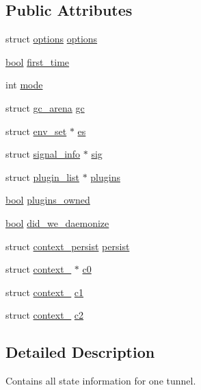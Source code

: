 \subsection*{Public Attributes}
\begin{DoxyCompactItemize}
\item 
struct \hyperlink{structoptions}{options} \hyperlink{structcontext_aa9a5e593e669fc88b8b1c7a9d69c5df1}{options}
\item 
\hyperlink{automatic_8c_abb452686968e48b67397da5f97445f5b}{bool} \hyperlink{structcontext_a4562924ba33d42c7c84399bc61e5634b}{first\+\_\+time}
\item 
int \hyperlink{structcontext_a05c5cc1b7bab3bf8fc5b1e23b38299f4}{mode}
\item 
struct \hyperlink{structgc__arena}{gc\+\_\+arena} \hyperlink{structcontext_ad2b1fffbd57d0ba779aa9b5ef8a9c78d}{gc}
\item 
struct \hyperlink{structenv__set}{env\+\_\+set} $\ast$ \hyperlink{structcontext_a9b3f2f6a6281c99c8c1e26598875d5ab}{es}
\item 
struct \hyperlink{structsignal__info}{signal\+\_\+info} $\ast$ \hyperlink{structcontext_a4a8aea25993019921e9568f611106773}{sig}
\item 
struct \hyperlink{structplugin__list}{plugin\+\_\+list} $\ast$ \hyperlink{structcontext_a7ebcb36e0e5cab031f1f3721ee39b9d3}{plugins}
\item 
\hyperlink{automatic_8c_abb452686968e48b67397da5f97445f5b}{bool} \hyperlink{structcontext_ab86d3cd4769ad44ed77c04c13c5382fb}{plugins\+\_\+owned}
\item 
\hyperlink{automatic_8c_abb452686968e48b67397da5f97445f5b}{bool} \hyperlink{structcontext_a34ef38cd7f895386a75d592fa0c820d8}{did\+\_\+we\+\_\+daemonize}
\item 
struct \hyperlink{structcontext__persist}{context\+\_\+persist} \hyperlink{structcontext_af52fc5d2e241fbee78d2216e9ff7ed72}{persist}
\item 
struct \hyperlink{structcontext__0}{context\+\_} $\ast$ \hyperlink{structcontext_a1d0cd1cb672a5fee441bdc504fc0fa93}{c0}
\item 
struct \hyperlink{structcontext__1}{context\+\_} \hyperlink{structcontext_aea116e1362b8f75f5fd13e8c06fc0cf3}{c1}
\item 
struct \hyperlink{structcontext__2}{context\+\_} \hyperlink{structcontext_a8d609499dcba303c18f50ef7b648644c}{c2}
\end{DoxyCompactItemize}


\subsection{Detailed Description}
Contains all state information for one tunnel.

